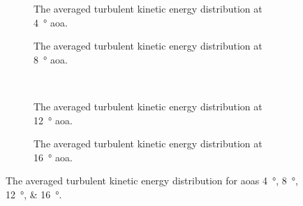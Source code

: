 \begin{figure}[htbp]
    \centering
    \begin{subfigure}{0.49\textwidth}
        \centering
        
        \caption{The averaged turbulent kinetic energy distribution at \qty{4}{\degree} \acrshort{aoa}.}
        \label{fig:averaged_ke_aoa4}
    \end{subfigure}
    \begin{subfigure}{0.49\textwidth}
        \centering
        
        \caption{The averaged turbulent kinetic energy distribution at \qty{8}{\degree} \acrshort{aoa}.}
        \label{fig:averaged_ke_aoa8}
    \end{subfigure} \\
    \begin{subfigure}{0.49\textwidth}
        \centering
        
        \caption{The averaged turbulent kinetic energy distribution at \qty{12}{\degree} \acrshort{aoa}.}
        \label{fig:averaged_ke_aoa12}
    \end{subfigure}
    \begin{subfigure}{0.49\textwidth}
        \centering
        
        \caption{The averaged turbulent kinetic energy distribution at \qty{16}{\degree} \acrshort{aoa}.}
        \label{fig:averaged_ke_aoa16}
    \end{subfigure}
    \caption{The averaged turbulent kinetic energy distribution for \acrshort{aoa}s \qtylist{4;8;12;16}{\degree}.}
    \label{fig:averaged_ke}
    \vspace*{3.5in}
\end{figure}

